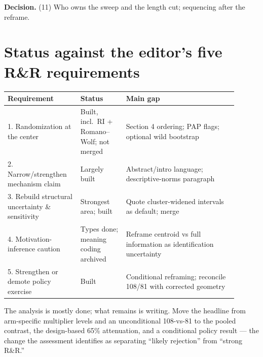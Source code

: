 \documentclass[11pt]{article}
\newenvironment{decision}
  {\par\medskip\noindent\begin{minipage}{\linewidth}\color{blue!50!black}\textbf{Decision.} }
  {\end{minipage}\par\medskip}
\begin{document}
\begin{decision}
(11) Who owns the sweep and the length cut; sequencing after the reframe.
\end{decision}

\section{Status against the editor's five R\&R requirements}

\begin{table}[htbp]
  \centering
  \small
  \begin{tabular}{p{0.28\linewidth}p{0.18\linewidth}p{0.44\linewidth}}
    \toprule
    Requirement & Status & Main gap \\
    \midrule
    1. Randomization at the center & Built, incl.\ RI + Romano--Wolf; not merged &
      Section 4 ordering; PAP flags; optional wild bootstrap \\
    2. Narrow/strengthen mechanism claim & Largely built &
      Abstract/intro language; descriptive-norms paragraph \\
    3. Rebuild structural uncertainty \& sensitivity & Strongest area; built &
      Quote cluster-widened intervals as default; merge \\
    4. Motivation-inference caution & Types done; meaning coding archived &
      Reframe centroid vs full information as identification uncertainty \\
    5. Strengthen or demote policy exercise & Built &
      Conditional reframing; reconcile 108/81 with corrected geometry \\
    \bottomrule
  \end{tabular}
\end{table}

\noindent
The analysis is mostly done; what remains is writing. Move the headline from
arm-specific multiplier levels and an unconditional 108-vs-81 to the pooled contrast,
the design-based 65\% attenuation, and a conditional policy result --- the change the
assessment identifies as separating ``likely rejection'' from ``strong R\&R.''
\end{document}
